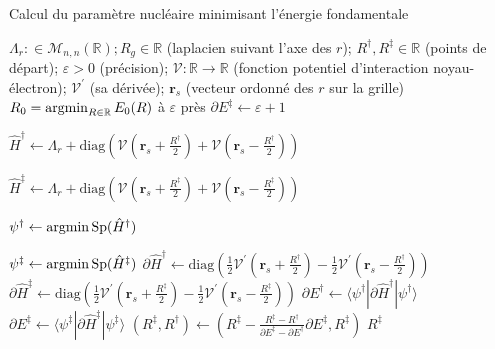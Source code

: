 \documentclass[svgnames,dvipsnames,a4paper,10pt,french]{report}
\begin{document}
\begin{algorithm}[H]
\caption{Calcul du paramètre nucléaire minimisant l'énergie fondamentale}
\label{alg:calc_en_mini}
\begin{algorithmic}[1]
\Require $\Lambda_r: \in \mathscr{M}_{n,n}(\mathbb{R}); R_g \in \mathbb{R}$ (laplacien suivant l'axe des $r$); $R^\dagger, R^\ddagger \in \mathbb{R}$ (points de départ); $\varepsilon>0$ (précision); $\mathcal{V} : \mathbb{R} \rightarrow \mathbb{R}$ (fonction potentiel d'interaction noyau-électron); $\mathcal{V}^\prime$ (sa dérivée); $\mathbf{r}_s$ (vecteur ordonné des $r$ sur la grille)
\Ensure $R_0 = \argmin_{R\in\mathbb{R}} E_0(R)$ à $\varepsilon$ près
\State $\partial E^\ddagger \gets \varepsilon +1$



\State $\hat{H}^\dagger \gets \Lambda_r + \text{diag}\left( \mathcal{V}(\mathbf{r}_s+\frac{R^\dagger}{2}) + \mathcal{V}(\mathbf{r}_s-\frac{R^\dagger}{2})\right)$

\State $\hat{H}^\ddagger \gets \Lambda_r + \text{diag}\left( \mathcal{V}(\mathbf{r}_s+\frac{R^\ddagger}{2}) + \mathcal{V}(\mathbf{r}_s-\frac{R^\ddagger}{2})\right)$

\State $\psi^\dagger \gets \argmin \text{Sp}( \hat{H}^\dagger)$ 

\State $\psi^\ddagger \gets  \argmin \text{Sp}(\hat{H}^\ddagger)$ 
\State $\partial\hat{H}^\dagger \gets \text{diag}\left( \frac{1}{2} \mathcal{V}^\prime(\mathbf{r}_s+\frac{R^\dagger}{2}) - \frac{1}{2} \mathcal{V}^\prime(\mathbf{r}_s-\frac{R^\dagger}{2})\right)$
\State $\partial\hat{H}^\ddagger \gets  \text{diag}\left( \frac{1}{2} \mathcal{V}^\prime(\mathbf{r}_s+\frac{R^\ddagger}{2}) - \frac{1}{2} \mathcal{V}^\prime(\mathbf{r}_s-\frac{R^\ddagger}{2})\right)$
\State $\partial E^\dagger \gets \langle \psi^\dagger | \partial\hat{H}^\dagger | \psi^\dagger \rangle$ 
\State $\partial E^\ddagger \gets \langle \psi^\ddagger | \partial\hat{H}^\ddagger | \psi^\ddagger \rangle$
\State $(R^\ddagger, R^\dagger) \gets \left( R^\ddagger - \frac{ R^\ddagger- R^\dagger}{\partial E^\ddagger-\partial E^\dagger} \partial E^\ddagger, R^\ddagger\right)$ 
\EndWhile
\EndProcedure
\Return $R^\ddagger$
\end{algorithmic}
\end{algorithm}
\end{document}
